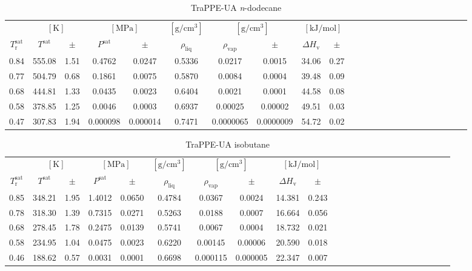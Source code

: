 \documentclass[%
 aip,
 jcp,
 sd,%
 amsmath,amssymb,
]{revtex4-1}
\begin{document}
\begin{table*}[]
\centering
\caption{
TraPPE-UA \textit{n}-dodecane
}
\label{tab:TraPPE-C12-trappe}
\begin{ruledtabular}
\begin{tabular}{cccccccccccccccccccccccc}
 & \multicolumn{2}{c}{$[\mathrm{K}]$} &	 \multicolumn{2}{c}{$[\mathrm{MPa}]$} & $[\mathrm{g/cm^3}]$ & \multicolumn{2}{c}{$[\mathrm{g/cm^3}]$} & \multicolumn{2}{c}{$[\mathrm{kJ/mol}]$} \\
$T_\mathrm{r}^{\mathrm{sat}}$ & $T^{\mathrm{sat}}$ & $\pm$ & $P^{\mathrm{sat}}$ & $\pm$ & $\rho_{\mathrm{liq}}$ & $\rho_{\mathrm{vap}}$ & $\pm$ & $\Delta H_{\mathrm{v}}$ & $\pm$
 \\
\hline		
0.84	&	555.08	&	1.51	&	0.4762	&	0.0247	&	0.5336	&	0.0217	&	0.0015	&	34.06	&	0.27	\\
0.77	&	504.79	&	0.68	&	0.1861	&	0.0075	&	0.5870	&	0.0084	&	0.0004	&	39.48	&	0.09	\\
0.68	&	444.81	&	1.33	&	0.0435	&	0.0023	&	0.6404	&	0.0021	&	0.0001	&	44.58	&	0.08	\\
0.58	&	378.85	&	1.25	&	0.0046	&	0.0003	&	0.6937	&	0.00025	&	0.00002	&	49.51	&	0.03	\\
0.47	&	307.83	&	1.94	&	0.000098	&	0.000014	&	0.7471	&	0.0000065	&	0.0000009	&	54.72	&	0.02	\\
\end{tabular}
\end{ruledtabular}
\end{table*}


\begin{table*}[]
\centering
\caption{
TraPPE-UA isobutane
}
\label{tab:TraPPE-iC4-trappe}
\begin{ruledtabular}
\begin{tabular}{cccccccccccccccccccccccc}
 & \multicolumn{2}{c}{$[\mathrm{K}]$} &	 \multicolumn{2}{c}{$[\mathrm{MPa}]$} & $[\mathrm{g/cm^3}]$ & \multicolumn{2}{c}{$[\mathrm{g/cm^3}]$} & \multicolumn{2}{c}{$[\mathrm{kJ/mol}]$} \\
$T_\mathrm{r}^{\mathrm{sat}}$ & $T^{\mathrm{sat}}$ & $\pm$ & $P^{\mathrm{sat}}$ & $\pm$ & $\rho_{\mathrm{liq}}$ & $\rho_{\mathrm{vap}}$ & $\pm$ & $\Delta H_{\mathrm{v}}$ & $\pm$
 \\
\hline		
0.85	&	348.21	&	1.95	&	1.4012	&	0.0650	&	0.4784	&	0.0367	&	0.0024	&	14.381	&	0.243	\\
0.78	&	318.30	&	1.39	&	0.7315	&	0.0271	&	0.5263	&	0.0188	&	0.0007	&	16.664	&	0.056	\\
0.68	&	278.45	&	1.78	&	0.2475	&	0.0139	&	0.5741	&	0.0067	&	0.0004	&	18.732	&	0.021	\\
0.58	&	234.95	&	1.04	&	0.0475	&	0.0023	&	0.6220	&	0.00145	&	0.00006	&	20.590	&	0.018	\\
0.46	&	188.62	&	0.57	&	0.0031	&	0.0001	&	0.6698	&	0.000115	&	0.000005	&	22.347	&	0.007	\\
\end{tabular}
\end{ruledtabular}
\end{table*}
\end{document}
